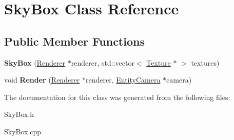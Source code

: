 \hypertarget{class_sky_box}{\section{Sky\-Box Class Reference}
\label{class_sky_box}
}
\subsection*{Public Member Functions}
\begin{DoxyCompactItemize}
\item 
\hypertarget{class_sky_box_ae1dd39a3c6ef5cd09ac6797088a30cd7}{{\bfseries Sky\-Box} (\hyperlink{class_renderer}{Renderer} $\ast$renderer, std\-::vector$<$ \hyperlink{class_texture}{Texture} $\ast$ $>$ textures)}\label{class_sky_box_ae1dd39a3c6ef5cd09ac6797088a30cd7}

\item 
\hypertarget{class_sky_box_ab2a34578903c355c73a5a9d9099832bb}{void {\bfseries Render} (\hyperlink{class_renderer}{Renderer} $\ast$renderer, \hyperlink{class_entity_camera}{Entity\-Camera} $\ast$camera)}\label{class_sky_box_ab2a34578903c355c73a5a9d9099832bb}

\end{DoxyCompactItemize}


The documentation for this class was generated from the following files\-:\begin{DoxyCompactItemize}
\item 
Sky\-Box.\-h\item 
Sky\-Box.\-cpp\end{DoxyCompactItemize}

